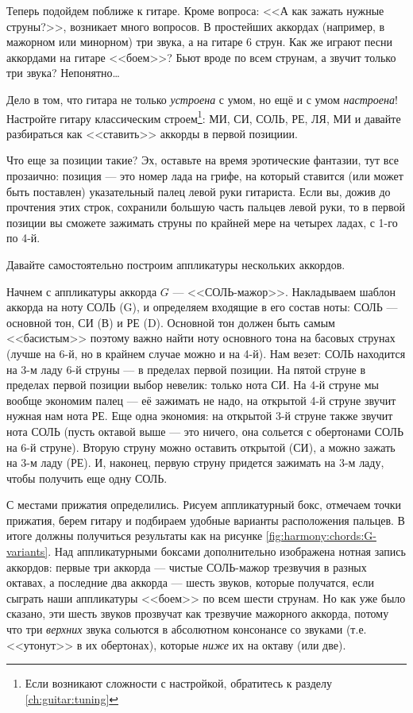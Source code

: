 Теперь подойдем поближе к гитаре. Кроме вопроса: <<А как зажать нужные струны?>>, возникает много вопросов. В простейших аккордах (например, в мажорном или минорном) три звука, а на гитаре 6 струн. Как же играют песни аккордами на гитаре <<боем>>? Бьют вроде по всем струнам, а звучит только три звука? Непонятно\ldots

Дело в том, что гитара не только \emph{устроена} с умом, но ещё и с умом \emph{настроена}! Настройте гитару классическим строем\footnote{Если возникают сложности с настройкой, обратитесь к разделу \ref{ch:guitar:tuning}}: МИ, СИ, СОЛЬ, РЕ, ЛЯ, МИ и давайте разбираться как <<ставить>> аккорды в первой позициии.

Что еще за позиции такие? Эх, оставьте на время эротические фантазии, тут все прозаично: позиция --- это номер лада на грифе, на который ставится (или может быть поставлен) указательный палец левой руки гитариста. Если вы, дожив до прочтения этих строк, сохранили большую часть пальцев левой руки, то в первой позиции вы сможете зажимать струны по крайней мере на четырех ладах, с 1-го по 4-й. 

Давайте самостоятельно построим аппликатуры нескольких аккордов. 

Начнем с аппликатуры аккорда $G$ --- <<СОЛЬ-мажор>>. Накладываем шаблон аккорда на ноту СОЛЬ (G), и определяем входящие в его состав ноты: СОЛЬ --- основной тон, СИ (В) и РЕ (D). Основной тон должен быть самым <<басистым>> поэтому важно найти ноту основного тона на басовых струнах (лучше на 6-й, но в крайнем случае можно и на 4-й). Нам везет: СОЛЬ находится на 3-м ладу 6-й струны --- в пределах первой позиции. На пятой струне в пределах первой позиции выбор невелик: только нота СИ. На 4-й струне мы вообще экономим палец --- её зажимать не надо, на открытой 4-й струне звучит нужная нам нота РЕ. Еще одна экономия: на открытой 3-й струне также звучит нота СОЛЬ (пусть октавой выше --- это ничего, она сольется с обертонами СОЛЬ на 6-й струне). Вторую струну можно оставить открытой (СИ), а можно зажать на 3-м ладу (РЕ). И, наконец, первую струну придется зажимать на 3-м ладу, чтобы получить еще одну СОЛЬ.

С местами прижатия определились. Рисуем аппликатурный бокс, отмечаем точки прижатия, берем гитару и подбираем удобные варианты расположения пальцев. В итоге должны получиться результаты как на рисунке \ref{fig:harmony:chords:G-variants}. Над аппликатурными боксами дополнительно изображена нотная запись аккордов: первые три аккорда --- чистые СОЛЬ-мажор трезвучия в разных октавах, а последние два аккорда --- шесть звуков, которые получатся, если сыграть наши аппликатуры <<боем>> по всем шести струнам. Но как уже было сказано, эти шесть звуков прозвучат как трезвучие мажорного аккорда, потому что три \emph{верхних} звука сольются в абсолютном консонансе со звуками (т.е. <<утонут>> в их обертонах), которые \emph{ниже} их на октаву (или две).

